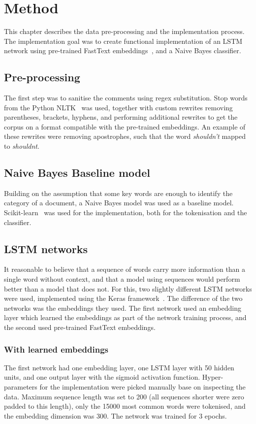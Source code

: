 \chapter{Method}
This chapter describes the data pre-processing and the implementation
process. The implementation goal was to create functional
implementation of an LSTM network using pre-trained FastText
embeddings~\cite{joulin2016bag,joulin2016fasttext}, and a Naive Bayes classifier.

\section{Pre-processing}
The first step was to sanitise the comments using regex
substitution. Stop words from the Python NLTK~\cite{nltk-stopwords}
was used, together with custom rewrites removing parentheses, brackets, hyphens,
and performing additional rewrites to get the corpus on a format
compatible with the pre-trained embeddings. An example of these
rewrites were removing apostrophes, such that the word
\textit{shouldn't} mapped to \textit{shouldnt}.

\section{Naive Bayes Baseline model}
Building on the assumption that some key words are enough to identify the
category of a document, a Naive Bayes model was used as a baseline
model. Scikit-learn~\cite{scikit-learn} was used for the
implementation, both for the tokenisation and the classifier.

\section{LSTM networks}\label{sec:lstm}
It reasonable to believe that a sequence of words carry more
information than a single word without context, and that a model using
sequences would perform better than a model that does not. For this,
two slightly different LSTM networks were used, implemented using the
Keras framework~\cite{chollet2015keras}. The difference of the two
networks was the embeddings they used. The first network used an
embedding layer which learned the embeddings as part of the network
training process, and the second used pre-trained FastText embeddings.

\subsection{With learned embeddings}
The first network had one embedding layer, one LSTM layer with 50 hidden
units, and one output layer with the sigmoid activation
function. Hyper-parameters for the implementation
were picked manually base on inspecting the data. Maximum sequence length was set
to 200 (all sequences shorter were zero padded to this length), only
the 15000 most common words were tokenised, and the embedding
dimension was 300. The network was trained for 3 epochs.

